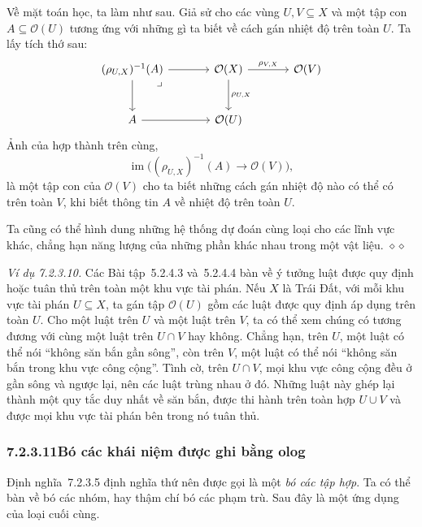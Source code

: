 Về mặt toán học, ta làm như sau. Giả sử cho các vùng $U,V\subseteq X$ và một tập con $A\subseteq\mathcal O(U)$ tương ứng với những gì ta biết về cách gán nhiệt độ trên toàn $U$. Ta lấy tích thớ sau:
\[
\begin{tikzcd}[column sep=large,row sep=large]
(\rho_{U,X})^{-1}(A)\arrow[r]\arrow[d]\arrow[dr,phantom,"\lrcorner",very near start]&\mathcal O(X)\arrow[d,"\rho_{U,X}"]\arrow[r,"\rho_{V,X}"]&\mathcal O(V)\\
A\arrow[r]&\mathcal O(U)&
\end{tikzcd}
\]
Ảnh của hợp thành trên cùng,
\[
\operatorname{im}\bigl((\rho_{U,X})^{-1}(A)\longrightarrow\mathcal O(V)\bigr),
\]
là một tập con của $\mathcal O(V)$ cho ta biết những cách gán nhiệt độ nào có thể có trên toàn $V$, khi biết thông tin $A$ về nhiệt độ trên toàn $U$.

Ta cũng có thể hình dung những hệ thống dự đoán cùng loại cho các lĩnh vực khác, chẳng hạn năng lượng của những phần khác nhau trong một vật liệu.
\hfill$\diamond\diamond$

\noindent\textit{Ví dụ 7.2.3.10.}\keepwithnext
Các Bài tập~5.2.4.3 và~5.2.4.4 bàn về ý tưởng luật được quy định hoặc tuân thủ trên toàn một khu vực tài phán. Nếu $X$ là Trái Đất, với mỗi khu vực tài phán $U\subseteq X$, ta gán tập $\mathcal O(U)$ gồm các luật được quy định áp dụng trên toàn $U$. Cho một luật trên $U$ và một luật trên $V$, ta có thể xem chúng có tương đương với cùng một luật trên $U\cap V$ hay không. Chẳng hạn, trên $U$, một luật có thể nói ``không săn bắn gần sông'', còn trên $V$, một luật có thể nói ``không săn bắn trong khu vực công cộng''. Tình cờ, trên $U\cap V$, mọi khu vực công cộng đều ở gần sông và ngược lại, nên các luật trùng nhau ở đó. Những luật này ghép lại thành một quy tắc duy nhất về săn bắn, được thi hành trên toàn hợp $U\cup V$ và được mọi khu vực tài phán bên trong nó tuân thủ.

\subsubsection*{7.2.3.11\quad Bó các khái niệm được ghi bằng olog}
Định nghĩa~7.2.3.5 định nghĩa thứ nên được gọi là một \emph{bó các tập hợp}. Ta có thể bàn về bó các nhóm, hay thậm chí bó các phạm trù. Sau đây là một ứng dụng của loại cuối cùng.
